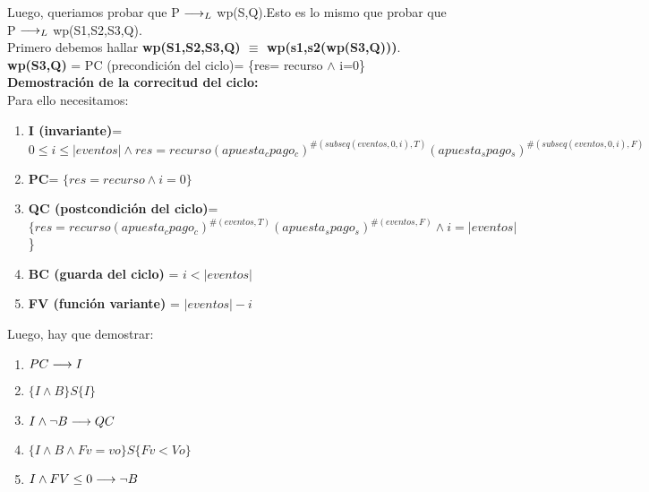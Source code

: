 \documentclass[10pt,a4paper]{article}
\begin{document}
\begin{flushleft}
\vspace{3mm}
Luego, queriamos probar que P $\longrightarrow _L$ wp(S,Q).Esto es lo mismo que probar que P $\longrightarrow _L$ wp(S1,S2,S3,Q).\\
\vspace{3mm}
Primero debemos hallar \textbf{wp(S1,S2,S3,Q) $\equiv$ wp(s1,s2(wp(S3,Q)))}.\\
\vspace{3mm}
\textbf{wp(S3,Q)} = PC (precondición del ciclo)= \{res= recurso $\wedge$ i=0\}\\
\vspace{3mm}
\textbf{Demostración de la correcitud del ciclo:}\\
\vspace{3mm}
Para ello necesitamos: 
\begin{enumerate} \setlength\itemsep{0cm}
	\item \textbf{I (invariante)}= $0\leq i \leq |eventos| \wedge res=recurso(apuesta_cpago_c)^{\#(subseq(eventos,0,i),T)}(apuesta_spago_s)^{\#(subseq(eventos,0,i),F)}$
	\item \textbf{PC}= $\{res= recurso \wedge i=0\}$
	\item \textbf{QC (postcondición del ciclo)}= $\{res=recurso(apuesta_cpago_c)^{\#(eventos,T)}(apuesta_spago_s)^{\#(eventos,F)} \wedge i=|eventos|$\}
	\item \textbf{BC (guarda del ciclo)} = $i < |eventos|$
	\item \textbf{FV (función variante)} = $|eventos|-i$
\end{enumerate}

Luego, hay que demostrar:
\begin{enumerate} \setlength\itemsep{0cm}
	\item \textbf{$PC \longrightarrow I$}
	\item \textbf{$\{ I \wedge B \}S\{ I \}$}
	\item \textbf{$I \wedge \neg B \longrightarrow QC$}
	\item \textbf{$\{ I \wedge B \wedge Fv= vo \}S\{ Fv<Vo \}$}
	\item \textbf{$I \wedge FV\leq0 \longrightarrow \neg B$} 

\end{enumerate}


\end{flushleft}
\end{document}
